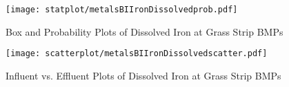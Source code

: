         \begin{figure}[hb]   %
            \centering
            \texttt{[image: statplot/metalsBIIronDissolvedprob.pdf]}
            \caption{Box and Probability Plots of Dissolved Iron at Grass Strip BMPs}
        \end{figure}         %
        
        
        \begin{figure}[hb]   %
            \centering
            \texttt{[image: scatterplot/metalsBIIronDissolvedscatter.pdf]}
            \caption{Influent vs. Effluent Plots of Dissolved Iron at Grass Strip BMPs}
        \end{figure}         %
        \clearpage
        